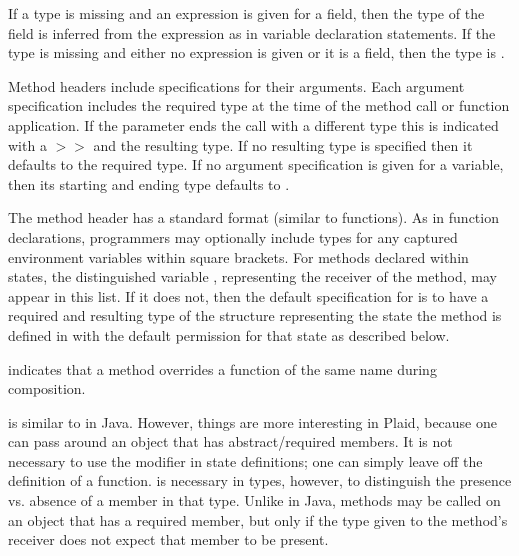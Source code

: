 If a type is missing and an expression is given for a
   field, then the type of the field is inferred from the
  expression as in variable declaration statements.  
  If the type is missing and either no expression is
  given or it is a  field, then the type is .

Method headers include specifications for their arguments.
Each argument specification includes the required type at the time of
the method call or function application.  If the parameter ends the
call with a different type this is indicated with a $>>$ and the
resulting type. If no resulting type is specified then it defaults to
the required type.  If no argument specification is given for
a variable, then its starting and ending type defaults to .

The method header  has a standard format (similar to
functions).  As in function declarations, programmers may optionally
include types for any captured environment variables within square brackets. For methods
declared within states, the distinguished variable ,
representing the receiver of the method, may appear in this list.  If
it does not, then the default specification for  is to have a required
and resulting type of the structure representing the state the method is defined in
with the default permission for that state as described below.

\begin{quote}



 {}

 {}


 {}


 {}

 {}

\end{quote}


 indicates that a method overrides a function of the
same name during composition.

 is similar to  in Java.  However,
things are more interesting in Plaid, because one can pass around an
object that has abstract/required members.  It is not necessary to
use the  modifier in state definitions; one can simply
leave off the definition of a function.   is necessary
in types, however, to distinguish the presence vs. absence of a
member in that type.  Unlike in Java, methods may be called on an
object that has a required member, but only if the type given to the
method's receiver does not expect that member to be present.

